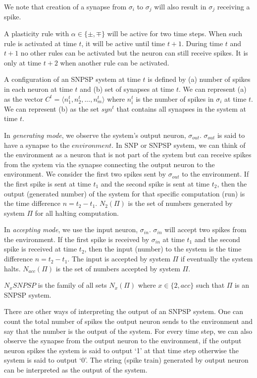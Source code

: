 \documentclass[runningheads,a4paper]{llncs}
\begin{document}
We note that creation of a synapse from $\sigma_i$ to $\sigma_j$ will also result in $\sigma_j$ receiving a spike. 
  
A plasticity rule with $\alpha \in \{\pm,\mp\}$ will be active for two time steps. When such rule is activated at time $t$, it will be active until 
time $t+1$. During time $t$ and $t+1$ no other rules can be activated but the neuron can still receive spikes. It is only at time $t+2$ when another
rule can be activated. 

A configuration of an SNPSP system at time $t$ is defined by (a) number of spikes in each neuron at time $t$ and (b) set of synapses at time $t$. 
We can represent (a) as the vector $C^t = \langle n_1^t, n_2^t, ...,n_m^t\rangle$ where $n_i^t$ is the number of spikes in $\sigma_i$ at time $t$.
We can represent (b) as the set $syn^t$ that contains all synapses in the system at time $t$.

In \textit{generating mode}, we observe the system's output neuron, $\sigma_{out}$. $\sigma_{out}$ is said to have a synapse to the $
\textit{environment}$. In SNP or SNPSP system, we can think of the environment as a neuron that is not part of the system but can receive spikes
from the system via the synapse connecting the output neuron to the environment. We consider the first two spikes sent by $\sigma_{out}$ to the environment.
If the first spike is sent at time $t_1$ and the second spike is sent at time $t_2$, then the output (generated number) of the system for that 
specific computation (run) is the time difference $n=t_2-t_1$. $N_2(\Pi)$ is the set of numbers generated by system  $\Pi$ for all halting
computation.

In \textit{accepting mode}, we use the input neuron, $\sigma_{in}$. $\sigma_{in}$ will accept two spikes from the environment. If the first spike is
received by $\sigma_{in}$ at time $t_1$ and the second spike is received at time $t_2$, then the input (number) to the system is the time difference 
$n=t_2-t_1$. The input is accepted by system $\Pi$ if eventually the system halts.  $N_{acc}(\Pi)$ is the set of numbers accepted by system $\Pi$.

$N_xSNPSP$ is the family of all sets $N_x(\Pi)$ where $x \in \{2, acc\}$ such that $\Pi$ is an SNPSP system.

There are other ways of interpreting the output of an SNPSP system. One can count the total number of spikes the output neuron sends to the
environment and say that the number is the output of the system. For every time step, we can also observe the synapse from the output neuron to the
environment, if the output neuron spikes the system is said to output `1' at that time step otherwise the system is said to output `0'. The string
(spike train) generated by output neuron can be interpreted as the output of the system.
\end{document}
